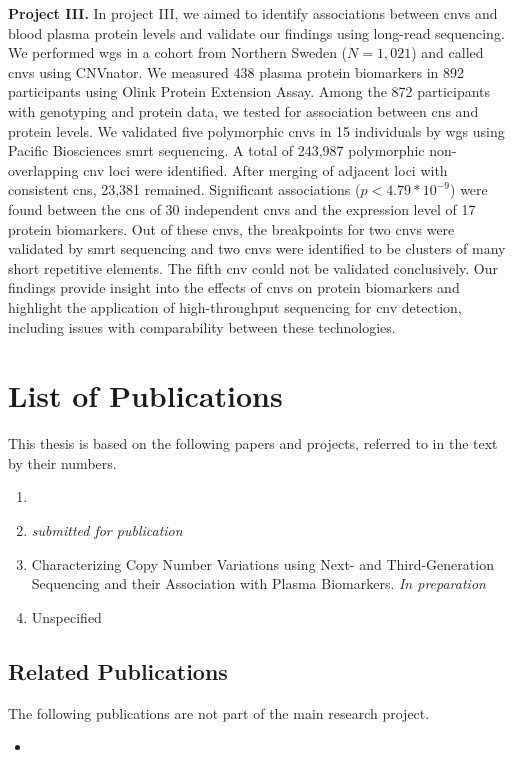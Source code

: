 \documentclass[twoside=false]{scrbook}
\begin{document}
\textbf{Project III.}
In project III, we aimed to identify associations between \glspl{cnv} and blood plasma protein levels and validate our findings using long-read sequencing.
We performed \gls{wgs} in a cohort from Northern Sweden ($N= 1,021$) and called \glspl{cnv} using CNVnator.
We measured 438 plasma protein biomarkers in 892 participants using Olink Protein Extension Assay.
Among the 872 participants with genotyping and protein data, we tested for association between \glspl{cn} and protein levels.
We validated five polymorphic \glspl{cnv} in 15 individuals by \gls{wgs} using Pacific Biosciences \gls{smrt} sequencing.
A total of 243,987 polymorphic non-overlapping \gls{cnv} loci were identified.
After merging of adjacent loci with consistent \glspl{cn}, 23,381 remained.
Significant associations ($p<4.79 * 10^{-9}$) were found between the \glspl{cn} of 30 independent \glspl{cnv} and the expression level of 17 protein biomarkers.
Out of these \glspl{cnv}, the breakpoints for two \glspl{cnv} were validated by \gls{smrt} sequencing and two \glspl{cnv} were identified to be clusters of many short repetitive elements.
The fifth \gls{cnv} could not be validated conclusively.
Our findings provide insight into the effects of \glspl{cnv} on protein biomarkers and highlight the application of high-throughput sequencing for \gls{cnv} detection, including issues with comparability between these technologies.


\chapter{List of Publications}
This thesis is based on the following papers and projects, referred to in the text by their numbers.

\begin{enumerate}[label=\Roman*.]
    \item {} 
    \item {} \textit{submitted for publication} 
    \item Characterizing Copy Number Variations using Next- and Third-Generation Sequencing and their Association with Plasma Biomarkers. \textit{In preparation}
    \item Unspecified
\end{enumerate}

\section*{Related Publications}
The following publications are not part of the main research project.
\begin{itemize}
    \item {} 
\end{itemize}
\end{document}
